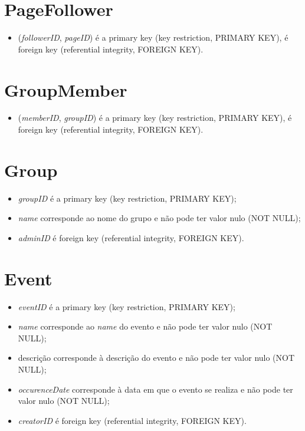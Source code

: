 \documentclass[12pt]{report}
\begin{document}
\section{PageFollower}

\begin{itemize}
    \item (\textit{followerID}, \textit{pageID}) é a primary key (key restriction, PRIMARY KEY), é foreign key (referential integrity, FOREIGN KEY).
\end{itemize}

\section{GroupMember}

\begin{itemize}
    \item (\textit{memberID}, \textit{groupID}) é a primary key (key restriction, PRIMARY KEY), é foreign key (referential integrity, FOREIGN KEY).
\end{itemize}

\section{Group}

\begin{itemize}
    \item \textit{groupID} é a primary key (key restriction, PRIMARY KEY);
    \item \textit{name} corresponde ao nome do grupo e não pode ter valor nulo (NOT NULL);
    \item \textit{adminID} é foreign key (referential integrity, FOREIGN KEY).
\end{itemize}

\section{Event}

\begin{itemize}
    \item \textit{eventID} é a primary key (key restriction, PRIMARY KEY);
    \item \textit{name}  corresponde ao \textit{name} do evento e não pode ter valor nulo (NOT NULL);
    \item descrição  corresponde à descrição do evento e não pode ter valor nulo (NOT NULL);
    \item \textit{occurenceDate} corresponde à data em que o evento se realiza e não pode ter valor nulo (NOT NULL);
    \item \textit{creatorID} é foreign key (referential integrity, FOREIGN KEY).
\end{itemize}
\end{document}
